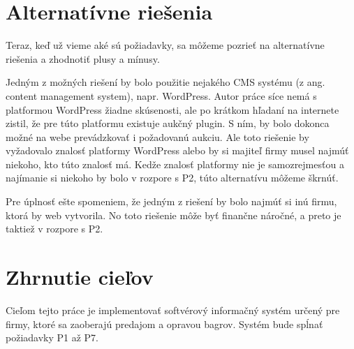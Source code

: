 \section{Alternatívne riešenia}
\label{alternativne riesenia}

Teraz, keď už vieme aké sú požiadavky, sa môžeme pozrieť na alternatívne riešenia a zhodnotiť plusy a mínusy.

Jedným z možných riešení by bolo použitie nejakého CMS systému (z ang. content management system), napr. WordPress. Autor práce síce nemá s platformou WordPress žiadne skúsenosti, ale po krátkom hľadaní na internete zistil, že pre túto platformu existuje aukčný plugin. S ním, by bolo dokonca možné na webe prevádzkovať i požadovanú aukciu. Ale toto riešenie by vyžadovalo znalosť platformy WordPress alebo by si majiteľ firmy musel najmúť niekoho, kto túto znalosť má. Kedže znalosť platformy nie je samozrejmesťou a najímanie si niekoho by bolo v rozpore s P2, túto alternatívu môžeme škrnúť.

Pre úplnosť ešte spomeniem, že jedným z riešení by bolo najmúť si inú firmu, ktorá by web vytvorila. No toto riešenie môže byť finančne náročné, a preto je taktiež v rozpore s P2.

\section{Zhrnutie cieľov}

Cieľom tejto práce je implementovať softvérový informačný systém určený pre firmy, ktoré sa zaoberajú predajom a opravou bagrov. Systém bude spĺnať požiadavky P1 až P7.
